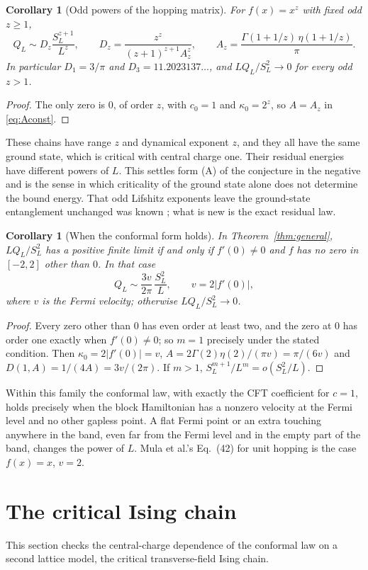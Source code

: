 \documentclass[11pt,a4paper]{article}
\newtheorem{corollary}[theorem]{Corollary}
\theoremstyle{remark}
\begin{document}
\begin{corollary}[Odd powers of the hopping matrix]\label{cor:odd}
For $f(x)=x^z$ with fixed odd $z\ge1$,
\[
 Q_L\sim D_z\frac{S_L^{z+1}}{L^z},\qquad
 D_z=\frac{z^z}{(z+1)^{z+1} A_z^z},\qquad
 A_z=\frac{\Gamma(1+1/z)\,\eta(1+1/z)}{\pi}.
\]
In particular $D_1=3/\pi$ and $D_3=11.2023137\ldots$, and $LQ_L/S_L^2\to0$ for every odd $z>1$.
\end{corollary}
\begin{proof}
The only zero is $0$, of order $z$, with $c_0=1$ and $\kappa_0=2^z$, so $A=A_z$ in \eqref{eq:Aconst}.
\end{proof}
These chains have range $z$ and dynamical exponent $z$, and they all have the same ground state, which is critical with central charge one. Their residual energies have different powers of $L$. This settles form (A) of the conjecture in the negative and is the sense in which criticality of the ground state alone does not determine the bound energy. That odd Lifshitz exponents leave the ground-state entanglement unchanged was known \cite{hartmann}; what is new is the exact residual law.

\begin{corollary}[When the conformal form holds]\label{cor:iff}
In Theorem~\ref{thm:general}, $LQ_L/S_L^2$ has a positive finite limit if and only if $f'(0)\ne0$ and $f$ has no zero in $[-2,2]$ other than $0$. In that case
\[
 Q_L\sim\frac{3v}{2\pi}\,\frac{S_L^2}{L},\qquad v=2|f'(0)|,
\]
where $v$ is the Fermi velocity; otherwise $LQ_L/S_L^2\to0$.
\end{corollary}
\begin{proof}
Every zero other than $0$ has even order at least two, and the zero at $0$ has order one exactly when $f'(0)\ne0$; so $m=1$ precisely under the stated condition. Then $\kappa_0=2|f'(0)|=v$, $A=2\Gamma(2)\eta(2)/(\pi v)=\pi/(6v)$ and $D(1,A)=1/(4A)=3v/(2\pi)$. If $m>1$, $S_L^{m+1}/L^m=o(S_L^2/L)$.
\end{proof}
Within this family the conformal law, with exactly the CFT coefficient for $c=1$, holds precisely when the block Hamiltonian has a nonzero velocity at the Fermi level and no other gapless point. A flat Fermi point or an extra touching anywhere in the band, even far from the Fermi level and in the empty part of the band, changes the power of $L$. Mula et al.'s Eq.~(42) for unit hopping is the case $f(x)=x$, $v=2$.

\section{The critical Ising chain}\label{sec:ising}
This section checks the central-charge dependence of the conformal law on a second lattice model, the critical transverse-field Ising chain.
\end{document}
